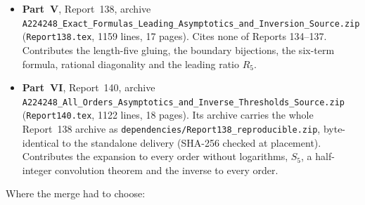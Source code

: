 \documentclass[11pt,letterpaper]{article}
\theoremstyle{remark}\newtheorem{remark}[theorem]{Remark}
\numberwithin{equation}{section}
\newcommand{\file}[1]{\nolinkurl{#1}}
\begin{document}
\begin{itemize}
\item \textbf{Part~V}, Report~138, archive \file{A224248_Exact_Formulas_Leading_Asymptotics_and_Inversion_Source.zip} (\file{Report138.tex}, 1159 lines, 17 pages). Cites none of Reports 134--137. Contributes the length-five gluing, the boundary bijections, the six-term formula, rational diagonality and the leading ratio $R_5$.
\item \textbf{Part~VI}, Report~140, archive \file{A224248_All_Orders_Asymptotics_and_Inverse_Thresholds_Source.zip} (\file{Report140.tex}, 1122 lines, 18 pages). Its archive carries the whole Report~138 archive as \file{dependencies/Report138_reproducible.zip}, byte-identical to the standalone delivery (SHA-256 checked at placement). Contributes the expansion to every order without logarithms, $S_5$, a half-integer convolution theorem and the inverse to every order.
\end{itemize}
Where the merge had to choose:
\end{document}
